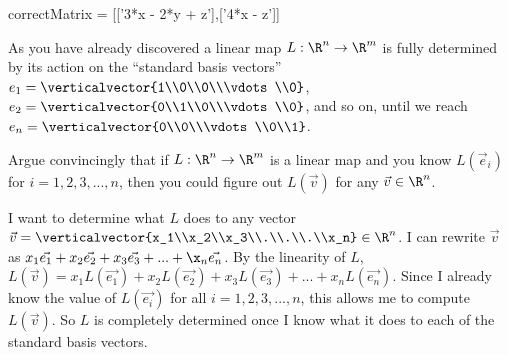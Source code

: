 \documentclass{ximera}
\begin{document}
\begin{question}
\begin{solution}
    \begin{matrix-answer}[name=v]
      correctMatrix = [['3*x - 2*y + z'],['4*x - z']]
    \end{matrix-answer}
    
  \end{solution}

  As you have already discovered a linear map $L: \R^n \to \R^m$ is
  fully determined by its action on the ``standard basis vectors''
  $e_1 = \verticalvector{1\\0\\0\\\vdots\\0}$, $e_2 =
  \verticalvector{0\\1\\0\\\vdots\\0}$, and so on, until we reach $e_n
  = \verticalvector{0\\0\\\vdots\\0\\1}$.

  Argue convincingly that if $L:\R^n \to\R^m$ is a linear map and you know $L(\vec{e}_i)$ for $i=1,2,3,...,n$, then you could figure out $L(\vec{v})$ for
  any $\vec{v} \in \R^n$.
  \begin{free-response}
    I want to determine what $L$ does to any vector $\vec{v} = \verticalvector{x_1\\x_2\\x_3\\.\\.\\.\\x_n} \in \R^n$.  
    I can rewrite $\vec{v}$ as $x_1\vec{e_1}+x_2\vec{e_2}+x_3\vec{e_3}+...+\x_n\vec{e_n}$.  By the linearity of $L$,
    $L(\vec{v}) = x_1L(\vec{e_1})+x_2L(\vec{e_2})+x_3L(\vec{e_3})+...+x_nL(\vec{e_n})$.  Since I already know the value of 
    $L(\vec{e_i})$ for all $i=1,2,3,...,n$, this allows me to compute $L(\vec{v})$.  So $L$ is completely determined once I know what it does to each of the
    standard basis vectors. 
  \end{free-response}
\end{question}

\end{document}
